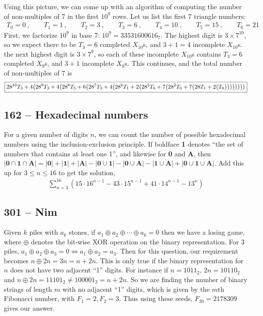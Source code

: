 \documentclass{article}
\begin{document}
Using this picture, we can come up with an algorithm of computing the number of non-multiples of 7 in the first $10^9$ rows.
Let us list the first 7 triangle numbers:
\begin{align*}
	T_0 = 0~, \qquad T_1 = 1~, \qquad T_2 = 3 ~, \qquad T_3 = 6 ~,\qquad T_4 = 10 ~,\qquad T_5 = 15 ~, \qquad T_6 = 21
\end{align*}
First, we factorize $10^9$ in base 7: $10^9 = 33531600616_7$.
The highest digit is $3 \times 7^{10}$, so we expect there to be $T_3 = 6$ completed $X_{10}$s, and $3+1 = 4$ incomplete $X_{10}$s.
the next highest digit is $3 \times 7^9$, so each of these incomplete $X_{10}$s contains $T_3 = 6$ completed $X_9$s, and $3+1$ incomplete $X_8$s.
This continues, and the total number of non-multiples of 7 is
\begin{align*}
	\boxed{ 28^{10} T_3 + 4 \qty( 28^9 T_3 + 4 \qty( 28^8 T_5 + 6 \qty( 28^7 T_3 + 4 \qty( 28^6 T_1 + 2 \qty( 28^5 T_6 + 7 \qty( 28^2 T_6 + 7 \qty\big( 28 T_1 + 2 \qty\big( T_6 )))))))) } 
\end{align*}


\subsection*{162 -- Hexadecimal numbers} 
For a given number of digits $n$, we can count the number of possible hexadecimal numbers using the inclusion-exclusion principle. 
If boldface \textbf{1} denotes ``the set of numbers that contains at least one 1'', and likewise for \textbf{0} and \textbf{A}, then $|\mathbf{0} \cap \mathbf{1} \cap \mathbf{A}| = |\mathbf{0}| + |\mathbf{1}| + |\mathbf{A}| - |\mathbf{0} \cup \mathbf{1}| - |\mathbf{0} \cup \mathbf{A}| - |\mathbf{1} \cup \mathbf{A}| + |\mathbf{0} \cup \mathbf{1} \cup \mathbf{A}|$.
Add this up for $3 \leq n \leq 16$ to get the solution, 
\begin{align*}
	\boxed{ \sum_{n=3}^{16} \left(15 \cdot 16^{n-1} - 43 \cdot 15^{n-1} + 41 \cdot 14^{n-1} - 13^n\right) } 
\end{align*}


\subsection*{301 -- Nim} 
Given $k$ piles with $a_k$ stones, if $a_1 \oplus a_2 \oplus \dotsb \oplus a_k = 0$ then we have a losing game, where $\oplus$ denotes the bit-wise XOR operation on the binary representation. 
For 3 piles, $a_1 \oplus a_2 \oplus a_3 = 0 \iff a_1 \oplus a_2 = a_3$. 
Then for this question, our requirement becomes $n \oplus 2n = 3n = n + 2n$. 
This is only true if the binary representation for $n$ does not have two adjacent ``1'' digits. 
For instance if $n = 1011_2$, $2n = 10110_2$ and $n \oplus 2n = 11101_2 \neq 100001_2 = n+2n$. 
So we are finding the number of binary strings of length $m$ with no adjacent ``1'' digits, which is given by the $m$th Fibonacci number, with $F_1 = 2, F_2 = 3$. 
Thus using these seeds, $F_{30} = \boxed{2178309}$ gives our answer.
\end{document}
